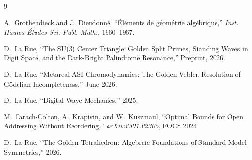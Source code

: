 \begin{thebibliography}{9}

A.~Grothendieck and J.~Dieudonn\'e,
``\'El\'ements de g\'eom\'etrie alg\'ebrique,''
\emph{Inst. Hautes \'Etudes Sci. Publ. Math.}, 1960--1967.

D.~La Rue,
``The SU(3) Center Triangle: Golden Split Primes, Standing Waves in Digit Space, and the Dark-Bright Palindrome Resonance,''
Preprint, 2026.

D.~La Rue,
``Metareal ASI Chromodynamics: The Golden Veblen Resolution of G\"odelian Incompleteness,''
June 2026.

D.~La Rue,
``Digital Wave Mechanics,'' 2025.

M.~Farach-Colton, A.~Krapivin, and W.~Kuszmaul,
``Optimal Bounds for Open Addressing Without Reordering,''
\emph{arXiv:2501.02305}, FOCS 2024.

D.~La Rue,
``The Golden Tetrahedron: Algebraic Foundations of Standard Model Symmetries,''
2026.

\end{thebibliography}
